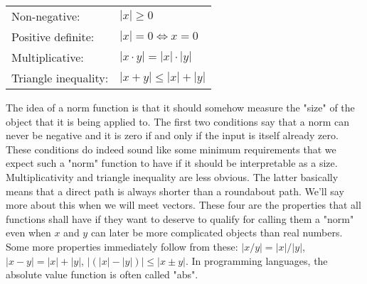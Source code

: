 \medskip
\begin{tabular}{l l}
\label{Tab:Norm}
Non-negative:         & $|x| \geq 0$  \\
Positive definite:    & $|x| = 0 \Leftrightarrow x = 0$  \\
Multiplicative:       & $|x \cdot y| = |x| \cdot |y| $  \\
Triangle inequality:  & $|x + y| \leq |x| + |y| $
\end{tabular}
\medskip

The idea of a norm function is that it should somehow measure the "size" of the object that it is being applied to. The first two conditions say that a norm can never be negative and it is zero if and only if the input is itself already zero. These conditions do indeed sound like some minimum requirements that we expect such a "norm" function to have if it should be interpretable as a size. Multiplicativity and triangle inequality are less obvious. The latter basically means that a direct path is always shorter than a roundabout path. We'll say more about this when we will meet vectors. These four are the properties that all functions shall have if they want to deserve to qualify for calling them a "norm" even when $x$ and $y$ can later be more complicated objects than real numbers. Some more properties immediately follow from these: $|x/y| = |x|/|y|$, $|x-y| = |x| + |y|$, $\bigl| (|x|-|y|) \bigr| \leq |x \pm y|$. In programming languages, the absolute value function is often called "abs". %

